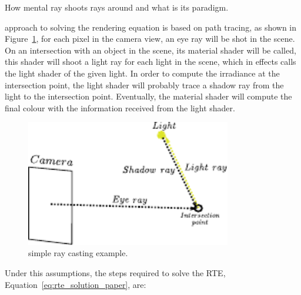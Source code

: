 How mental ray shoots rays around and what is its paradigm.

\MentalRay approach to solving the rendering equation is based on path tracing, as shown in Figure~\ref{fig:mental_ray_model}, for each pixel in the camera view, an eye ray will be shot in the scene.
On an intersection with an object in the scene, its material shader will be called, this shader will shoot a light ray for each light in the scene, which in effects calls the light shader of the given light.
In order to compute the irradiance at the intersection point, the light shader will probably trace a shadow ray from the light to the intersection point.
Eventually, the material shader will compute the final colour with the information received from the light shader. 

\begin{figure}[htbp!]
\centering
\includegraphics[width=0.8\textwidth]{img/mental_ray_model}
	\caption{\MentalRay simple ray casting example.}
	\label{fig:mental_ray_model}
\end{figure}

Under this assumptions, the steps required to solve the RTE, Equation~\ref{eq:rte_solution_paper}, are:

